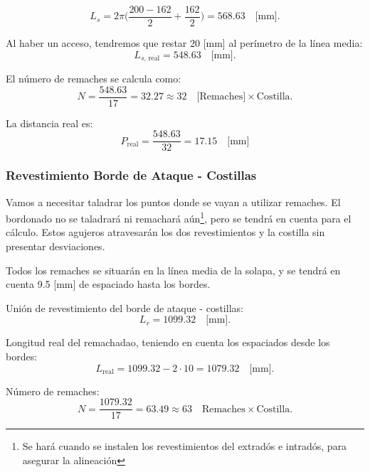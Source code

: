 \begin{equation}
    L_s = 2\pi \bigg( \dfrac{200-162}{2} + \dfrac{162}{2} \bigg) = 568.63 \quad \text{[mm]}.
\end{equation}

Al haber un acceso, tendremos que restar 20 [mm] al perímetro de la línea media:
\begin{equation}
    L_{s,\, \text{real}} = 548.63 \quad \text{[mm]}.
\end{equation}

El número de remaches se calcula como:
\begin{equation}
    N = \dfrac{548.63}{17} = 32.27 \approx 32 \quad \text{[Remaches]} \times \text{Costilla}.
\end{equation}

La distancia real es:
\begin{equation}
    P_{\text{real}} = \dfrac{548.63}{32} = 17.15 \quad \text{[mm]}
\end{equation}

\subsubsection{Revestimiento Borde de Ataque - Costillas} \label{subsub:ba}
Vamos a necesitar taladrar los puntos donde se vayan a utilizar remaches. El bordonado no se taladrará ni remachará aún\footnote{Se hará cuando se instalen los revestimientos del extradós e intradós, para asegurar la alineación}, pero se tendrá en cuenta para el cálculo. Estos agujeros atravesarán los dos revestimientos y la costilla sin presentar desviaciones.

Todos los remaches se situarán en la línea media de la solapa, y se tendrá en cuenta 9.5 [mm] de espaciado hasta los bordes.

Unión de revestimiento del borde de ataque - costillas:
\begin{equation}
    L_r = 1099.32 \quad \text{[mm]}.
\end{equation}

Longitud real del remachadao, teniendo en cuenta los espaciados desde los bordes:
\begin{equation}
    L_{\text{real}} = 1099.32 - 2 \cdot 10 = 1079.32 \quad \text{[mm]}.
\end{equation}

Número de remaches:
\begin{equation}
    N = \dfrac{1079.32}{17} = 63.49 \approx 63 \quad \text{Remaches} \times \text{Costilla}.
\end{equation}

